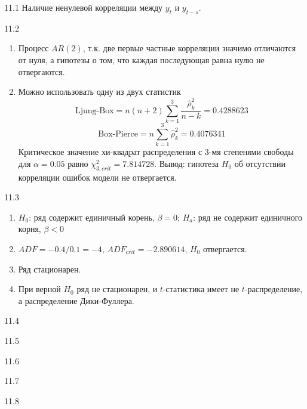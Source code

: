 \protect \hypertarget {soln:11.1}{}
\begin{solution}{{11.1}}
Наличие ненулевой корреляции между $y_t$ и $y_{t-s}$.
\end{solution}
\protect \hypertarget {soln:11.2}{}
\begin{solution}{{11.2}}
\begin{enumerate}
\item Процесс $AR(2)$, т.к. две первые частные корреляции значимо отличаются от нуля, а гипотезы о том, что каждая последующая равна нулю не отвергаются.
\item Можно использовать одну из двух статистик
\[
\text{Ljung-Box}=n(n+2)\sum_{k=1}^3\frac{\hat{\rho}_k^2}{n-k}=
0.4288623
\]
\[
\text{Box-Pierce}=n\sum_{k=1}^3\hat{\rho}_k^2=
0.4076341
\]
Критическое значение хи-квадрат распределения с 3-мя степенями свободы для $\alpha=0.05$ равно $\chi^2_{3,crit}=
7.814728
$.
Вывод: гипотеза $H_0$ об отсутствии корреляции ошибок модели не отвергается.
\end{enumerate}
\end{solution}
\protect \hypertarget {soln:11.3}{}
\begin{solution}{{11.3}}

\begin{enumerate}
\item $H_0$: ряд содержит единичный корень, $\beta=0$; $H_a$: ряд не содержит единичного корня, $\beta<0$
\item $ADF=-0.4/0.1=-4$, $ADF_{crit}=
-2.890614
$, $H_0$ отвергается.
\item Ряд стационарен.
\item При верной $H_0$ ряд не стационарен, и  $t$-статистика имеет не $t$-распределение, а распределение Дики-Фуллера.
\end{enumerate}
\end{solution}
\protect \hypertarget {soln:11.4}{}
\begin{solution}{{11.4}}
\end{solution}
\protect \hypertarget {soln:11.5}{}
\begin{solution}{{11.5}}
\end{solution}
\protect \hypertarget {soln:11.6}{}
\begin{solution}{{11.6}}
\end{solution}
\protect \hypertarget {soln:11.7}{}
\begin{solution}{{11.7}}
\end{solution}
\protect \hypertarget {soln:11.8}{}
\begin{solution}{{11.8}}
\end{solution}
